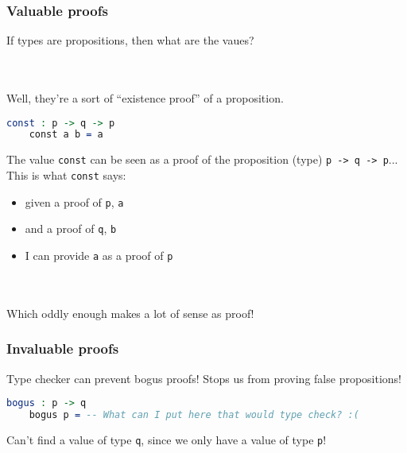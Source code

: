 \documentclass{beamer}
\begin{document}
\begin{frame}[fragile]
  \frametitle{Valuable proofs}
  If types are propositions, then what are the vaues?

  \pause \\~\\
  Well, they're a sort of ``existence proof'' of a proposition.

  \pause
  \begin{lstlisting}[language=Idris]
    const : p -> q -> p
    const a b = a
  \end{lstlisting}

  \pause
  The value \texttt{const} can be seen as a proof of the proposition (type) \texttt{p -> q -> p}... This is what \texttt{const} says:

  \begin{itemize}
  \pause
  \item given a proof of \texttt{p}, \texttt{a}
  \pause
  \item and a proof of \texttt{q}, \texttt{b}
  \pause
  \item I can provide \texttt{a} as a proof of \texttt{p}
  \end{itemize}

  \pause \\~\\
  Which oddly enough makes a lot of sense as proof!
\end{frame}

\begin{frame}[fragile]
  \frametitle{Invaluable proofs}

  Type checker can prevent bogus proofs! Stops us from proving false propositions!

  \pause
  \begin{lstlisting}[language=Idris]
    bogus : p -> q
    bogus p = -- What can I put here that would type check? :(
  \end{lstlisting}

  \pause
  Can't find a value of type \texttt{q}, since we only have a value of type \texttt{p}!
\end{frame}
\end{document}
